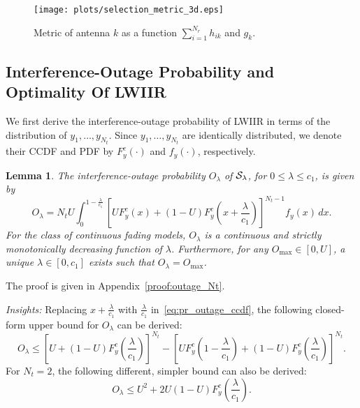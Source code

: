 \documentclass[12pt,draftcls,peerreview,onecolumn]{IEEEtran}
\newtheorem{lemma}{{\bf Lemma}}
\newcommand{\lam}{\lambda}
\newcommand{\Nt}{{N_t}}
\newcommand{\Nr}{{N_r}}
\newcommand{\such}{h}
\newcommand{\puch}{g}
\newcommand{\hk}[1]{{\such_{#1}}}
\newcommand{\gk}[1]{{\puch_{#1}}}
\newcommand{\outmax}{O_{\text{max}}}
\newcommand{\cone}{c_{1}}
\newcommand{\out}{O}
\newcommand{\m}{\cone}
\newcommand{\lambym}{\frac{\lam}{\m}}
\newcommand{\yk}[1]{y_{#1}}
\newcommand{\un}{U}
\newcommand{\callamrule}{{\cal S_{{\lam}}}}
\newcommand{\outlam}{\out_{\lam}}
\newcommand{\sumnr}{\sum_{i=1}^{\Nr}}
\begin{document}
\begin{figure}
\centering 
\texttt{[image: plots/selection\_metric\_3d.eps]}
\caption{Metric of antenna $k$ as a function $\sumnr\hk{ik}$ and $\gk{k}$.}
\label{fig:metric}
\end{figure}

\subsection{Interference-Outage Probability and Optimality Of LWIIR}
We first derive the interference-outage probability of LWIIR in terms of the distribution of $\yk{1},\ldots,\yk{\Nt}$. Since $\yk{1},\ldots,\yk{\Nt}$ are identically distributed, we denote their CCDF and PDF by $F_{y}^{c}(\cdot)$ and $f_{y}(\cdot)$, respectively. 
\begin{lemma}
\label{lem:outage_Nt}
The interference-outage probability $\outlam$ of $\callamrule$, for $0\leq\lam\leq\cone$, is given by
\begin{equation}
\label{eq:pr_outage_ccdf} 
\outlam  =  \Nt\un \int_{0}^{1-\lambym} 	
\left[ \un F_{y}^{c}\left(x\right) + \left(1 -\un\right)F_{y}^{c}\left(x+\lambym\right) \right]^{\Nt-1} f_{y}(x)\,dx.
\end{equation}
For the class of continuous fading models, $\outlam$ is a continuous and strictly monotonically decreasing function of $\lam$. Furthermore, for any $\outmax\in[0,\un]$, a unique $\lam\in[0,\cone]$ exists such that $\outlam=\outmax$. 
\end{lemma}
%
\begin{IEEEproof}
    The proof is given in Appendix~\ref{proof:outage_Nt}.
\end{IEEEproof}
%

{\em Insights:} Replacing $x+\lambym$ with $\lambym$ in~\eqref{eq:pr_outage_ccdf}, the following closed-form upper bound for $\outlam$ can be derived: 
\begin{equation}
\label{eq:pr_outage_ub}
\outlam  \leq \left[ \un + \left(1-\un\right)F_{y}^{c}\left(\lambym\right)  \right]^{\Nt} - \left[ \un F_{y}^{c}\left(1-\lambym\right) + \left(1-\un\right)F_{y}^{c}\left(\lambym\right)  \right]^{\Nt}.
\end{equation}
For $\Nt = 2$, the following different, simpler bound can also be derived: 
\begin{equation}
\label{eq:two_Nt_UB}
\outlam \leq \un^2 + 2\un(1-\un)F_{y}^{c}\left(\lambym\right).
\end{equation}
\end{document}
